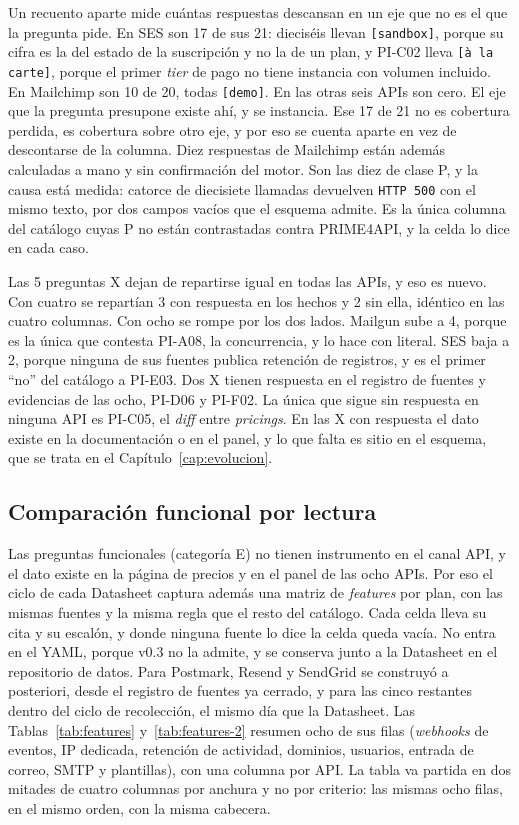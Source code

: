 Un recuento aparte mide cuántas respuestas descansan en un eje que no es el que la
pregunta pide. En SES son 17 de sus 21: dieciséis llevan \texttt{[sandbox]}, porque su
cifra es la del estado de la suscripción y no la de un plan, y PI-C02 lleva
\texttt{[à la carte]}, porque el primer \textit{tier} de pago no tiene instancia con
volumen incluido. En Mailchimp son 10 de 20, todas \texttt{[demo]}. En las otras seis
APIs son cero. El eje que la pregunta presupone existe ahí, y se instancia. Ese 17 de
21 no es cobertura perdida, es cobertura sobre otro eje, y por eso se cuenta aparte en
vez de descontarse de la columna.
Diez respuestas de Mailchimp están además calculadas a mano y sin confirmación del
motor. Son las diez de clase P, y la causa está medida: catorce de diecisiete llamadas
devuelven \texttt{HTTP 500} con el mismo texto, por dos campos vacíos que el esquema
admite. Es la única columna del catálogo cuyas P no están contrastadas contra PRIME4API,
y la celda lo dice en cada caso.

Las 5 preguntas X dejan de repartirse igual en todas las APIs, y eso es nuevo. Con
cuatro se repartían 3 con respuesta en los hechos y 2 sin ella, idéntico en las cuatro
columnas. Con ocho se rompe por los dos lados. Mailgun sube a 4, porque es la única que
contesta PI-A08, la concurrencia, y lo hace con literal. SES baja a 2, porque ninguna de
sus fuentes publica retención de registros, y es el primer ``no'' del catálogo a PI-E03.
Dos X tienen respuesta en el registro de fuentes y evidencias de las ocho, PI-D06 y
PI-F02. La única que sigue sin respuesta en ninguna API es PI-C05, el \textit{diff}
entre \textit{pricings}. En las X con respuesta el dato existe en la documentación o en
el panel, y lo que falta es sitio en el esquema, que se trata en el
Capítulo~\ref{cap:evolucion}.

\subsection{Comparación funcional por lectura}
\label{subsec:hallazgos:funcional}

Las preguntas funcionales (categoría E) no tienen instrumento en el canal API, y el dato
existe en la página de precios y en el panel de las ocho APIs. Por eso el ciclo de cada
Datasheet captura además una matriz de \textit{features} por plan, con las mismas fuentes
y la misma regla que el resto del catálogo. Cada celda lleva su cita y su escalón, y
donde ninguna fuente lo dice la celda queda vacía. No entra en el YAML,
porque v0.3 no la admite, y se conserva junto a la Datasheet en el repositorio de datos.
Para Postmark, Resend y SendGrid se construyó a posteriori, desde el registro de
fuentes ya cerrado, y para las cinco restantes dentro del ciclo de recolección, el mismo
día que la Datasheet. Las Tablas~\ref{tab:features} y~\ref{tab:features-2} resumen ocho
de sus filas (\textit{webhooks} de eventos, IP dedicada, retención de actividad,
dominios, usuarios, entrada de correo, SMTP y plantillas), con una columna por API. La
tabla va partida en dos mitades de cuatro columnas por anchura y no por criterio: las
mismas ocho filas, en el mismo orden, con la misma cabecera.


